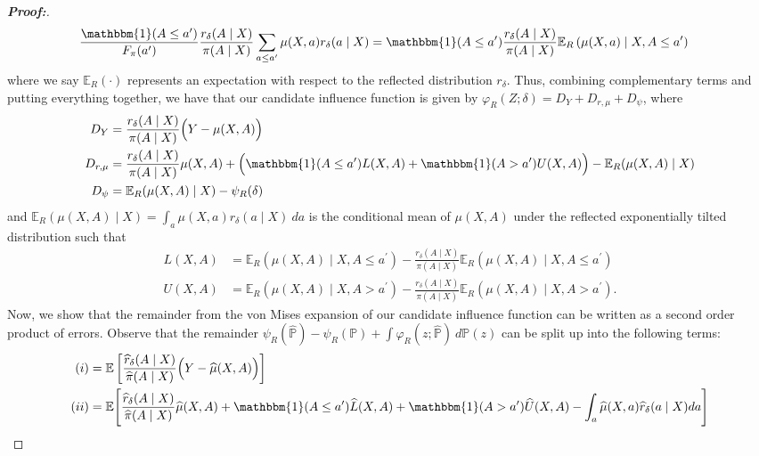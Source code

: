 \documentclass[11pt,twoside]{article}
\theoremstyle{definition}
\theoremstyle{remark}
\begin{document}
\begin{proof}[\textbf{Proof:}]
\begin{align*}
     \frac{\mathbbm{1}(A \leq a^{\prime})}{F_{\pi}(a^{\prime})} \frac{r_\delta(A \mid X)}{\pi(A \mid X)} \sum_{a \leq a^{\prime}} \mu(X, a) r_\delta(a \mid X) &= \mathbbm{1}(A \leq a^{\prime}) \frac{r_\delta(A \mid X)}{\pi(A \mid X)} \mathbb{E}_R\left( \mu(X, a) \mid X, A \leq a^{\prime} \right)
\end{align*}
where we say $\mathbb{E}_R(\cdot)$ represents an expectation with respect to the reflected distribution $r_\delta$. Thus, combining complementary terms and putting everything together, we have that our candidate influence function is given by $\varphi_R(Z;\delta) = D_Y + D_{r, \mu} + D_\psi$, where
\begin{align*}
    D_Y &= \frac{r_\delta(A \mid X)}{\pi(A \mid X)} \Big(Y - \mu(X, A) \Big) \\
    D_{r, \mu} &= \frac{r_\delta(A \mid X)}{\pi(A \mid X)} \mu(X, A) + \Big(\mathbbm{1}(A \leq a^{\prime})L(X, A) + \mathbbm{1}(A > a^{\prime}) U(X, A) \Big) - \mathbb{E}_R(\mu(X, A) \mid X) \\
    D_\psi &= \mathbb{E}_R(\mu(X, A) \mid X)  - \psi_R(\delta)
\end{align*}
and $\mathbb{E}_R(\mu(X, A) \mid X) = \int_a \mu(X, a) r_\delta(a \mid X) \ da$ is the conditional mean of $\mu(X, A)$ under the reflected exponentially tilted distribution such that
\begin{align*}
    L(X, A) &= \mathbb{E}_R(\mu(X, A) \mid X, A \leq a^{\prime}) - \frac{r_\delta(A \mid X)}{\pi(A \mid X)} \mathbb{E}_R(\mu(X, A) \mid X, A \leq a^{\prime}) \\
    U(X, A) &= \mathbb{E}_R(\mu(X, A) \mid X, A > a^{\prime}) - \frac{r_\delta(A \mid X)}{\pi(A \mid X)} \mathbb{E}_R(\mu(X, A) \mid X, A > a^{\prime}).
\end{align*}
Now, we show that the remainder from the von Mises expansion of our candidate influence function can be written as a second order product of errors. Observe that the remainder $\psi_R(\widehat{\mathbb{P}}) - \psi_R(\mathbb{P}) + \int \varphi_R(z; \widehat{\mathbb{P}}) \ d\mathbb{P}(z)$ can be split up into the following terms:
\begin{align*}
    (i) &= \mathbb{E}\left[\frac{\widehat{r}_\delta(A \mid X)}{\widehat{\pi}(A \mid X)} \Big(Y - \widehat{\mu}(X, A) \Big) \right] \\
    (ii) &=  \mathbb{E}\Bigg[\frac{\widehat{r}_\delta(A \mid X)}{\widehat{\pi}(A \mid X)} \widehat{\mu}(X, A) + \mathbbm{1}(A \leq a^{\prime}) \widehat{L}(X, A) + \mathbbm{1}(A > a^{\prime}) \widehat{U}(X, A)  -  \int_a \widehat{\mu}(X, a) \widehat{r}_\delta(a \mid X)da \Bigg] \\

\end{align*}
\end{proof}
\end{document}

